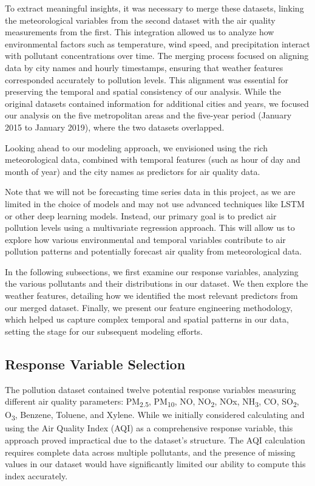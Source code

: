 \documentclass[twoside,11pt]{article}
\begin{document}
To extract meaningful insights, it was necessary to merge these datasets, linking the meteorological variables from the second dataset with the air quality measurements from the first. This integration allowed us to analyze how environmental factors such as temperature, wind speed, and precipitation interact with pollutant concentrations over time. The merging process focused on aligning data by city names and hourly timestamps, ensuring that weather features corresponded accurately to pollution levels. This alignment was essential for preserving the temporal and spatial consistency of our analysis. While the original datasets contained information for additional cities and years, we focused our analysis on the five metropolitan areas and the five-year period (January 2015 to January 2019), where the two datasets overlapped.

Looking ahead to our modeling approach, we envisioned using the rich meteorological data, combined with temporal features (such as hour of day and month of year) and the city names as predictors for air quality data.

Note that we will not be forecasting time series data in this project, as we are limited in the choice of models and may not use advanced techniques like LSTM or other deep learning models. Instead, our primary goal is to predict air pollution levels using a multivariate regression approach. This will allow us to explore how various environmental and temporal variables contribute to air pollution patterns and potentially forecast air quality from meteorological data.

In the following subsections, we first examine our response variables, analyzing the various pollutants and their distributions in our dataset. We then explore the weather features, detailing how we identified the most relevant predictors from our merged dataset. Finally, we present our feature engineering methodology, which helped us capture complex temporal and spatial patterns in our data, setting the stage for our subsequent modeling efforts.


\subsection{Response Variable Selection}

The pollution dataset contained twelve potential response variables measuring different air quality parameters: PM\textsubscript{2.5}, PM\textsubscript{10}, NO, NO\textsubscript{2}, NOx, NH\textsubscript{3}, CO, SO\textsubscript{2}, O\textsubscript{3}, Benzene, Toluene, and Xylene. While we initially considered calculating and using the Air Quality Index (AQI) as a comprehensive response variable, this approach proved impractical due to the dataset's structure. The AQI calculation requires complete data across multiple pollutants, and the presence of missing values in our dataset would have significantly limited our ability to compute this index accurately.
\end{document}
